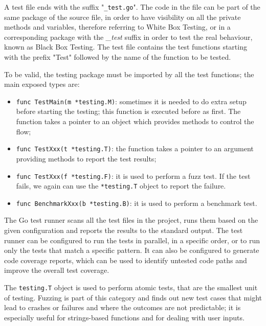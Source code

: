 A test file ends with the suffix "\texttt{\_test.go}". The code in the file can be part of the same package of the source file, in order to have visibility on all the private methods and variables, therefore referring to White Box Testing, or in a corresponding package with the \textit{\_test} suffix in order to test the real behaviour, known as Black Box Testing. The test file contains the test functions starting with the prefix "Test" followed by the name of the function to be tested.

To be valid, the testing package must be imported by all the test functions; the main exposed types are:
\begin{itemize}
  \item \texttt{func TestMain(m *testing.M)}: sometimes it is needed to do extra setup before starting the testing; this function is executed before as first. The function takes a pointer to an object which provides methods to control the flow;
  \item \texttt{func TestXxx(t *testing.T)}: the function takes a pointer to an argument providing methods to report the test results;
  \item \texttt{func TestXxx(f *testing.F)}: it is used to perform a fuzz test. If the test fails, we again can use the \texttt{*testing.T} object to report the failure.
  \item \texttt{func BenchmarkXxx(b *testing.B)}: it is used to perform a benchmark test.
\end{itemize}

The Go test runner scans all the test files in the project, runs them based on the given configuration and reports the results to the standard output. The test runner can be configured to run the tests in parallel, in a specific order, or to run only the tests that match a specific pattern. It can also be configured to generate code coverage reports, which can be used to identify untested code paths and improve the overall test coverage.

The \texttt{testing.T} object is used to perform atomic tests, that are the smallest unit of testing. Fuzzing is part of this category and finds out new test cases that might lead to crashes or failures and where the outcomes are not predictable; it is especially useful for strings-based functions and for dealing with user inputs.

